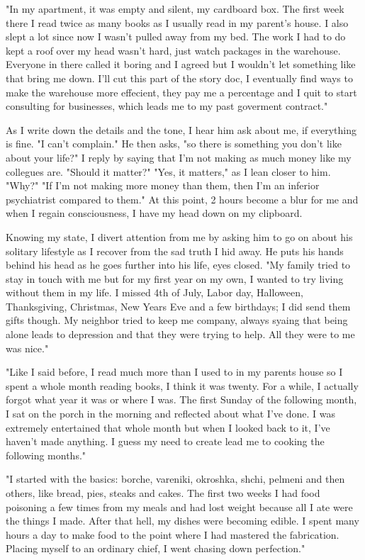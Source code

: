 		"In my apartment, it was empty and silent, my cardboard box. The first week there I read twice as many books as I usually read in my parent's house. I
	also slept a lot since now I wasn't pulled away from my bed. The work I had to do kept a roof over my head wasn't hard, just watch packages in the warehouse.
	Everyone in there called it boring and I agreed but I wouldn't let something like that bring me down. I'll cut this part of the story doc, I eventually find
	ways to make the warehouse more effecient, they pay me a percentage and I quit to start consulting for businesses, which leads me to my past goverment 
	contract."

		As I write down the details and the tone, I hear him ask about me, if everything is fine. "I can't complain." He then asks, "so there is something
	you don't like about your life?" I reply by saying that I'm not making as much money like my collegues are. "Should it matter?" 
	"Yes, it matters," as I lean closer to him. "Why?" "If I'm not making more money than them, then I'm an inferior psychiatrist compared to them."
	At this point, 2 hours become a blur for me and when I regain consciousness, I have my head down on my clipboard.

		Knowing my state, I divert attention from me by asking him to go on about his solitary lifestyle as I recover from the sad truth I hid away.
	He puts his hands behind his head as he goes further into his life, eyes closed. "My family tried to stay in touch with me but for my first year on my own, I 
	wanted to try living without them in my life. I missed 4th of July, Labor day, Halloween, Thanksgiving, Christmas, New Years Eve and a few birthdays; I did
	send them gifts though. My neighbor tried to keep me company, always syaing that being alone leads to depression and that they were trying to help. All they
	were to me was nice."

		"Like I said before, I read much more than I used to in my parents house so I spent a whole month reading books, I think it was twenty. For a while, I
	actually forgot what year it was or where I was. The first Sunday of the following month, I sat on the porch in the morning and reflected about what I've done.
	I was extremely entertained that whole month but when I looked back to it, I've haven't made anything. I guess my need to create lead me to cooking the 
	following months."

		"I started with the basics: borche, vareniki, okroshka, shchi, pelmeni and then others, like bread, pies, steaks and cakes. The first two weeks I had
	food poisoning a few times from my meals and had lost weight because all I ate were the things I made. After that hell, my dishes were becoming edible. I
	spent many hours a day to make food to the point where I had mastered the fabrication. Placing myself to an ordinary chief, I went chasing down perfection."

